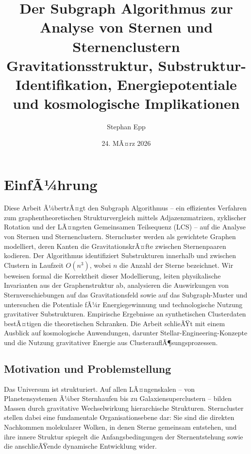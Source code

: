 ﻿\documentclass[a4paper,12pt]{report}
\title{\textbf{Der Subgraph Algorithmus zur Analyse von Sternen und Sternenclustern}\\
\large Gravitationsstruktur, Substruktur-Identifikation, Energiepotentiale\\
und kosmologische Implikationen}
\author{Stephan Epp}
\date{24. MÃ¤rz 2026}
\theoremstyle{definition}
\begin{document}
\maketitle

\tableofcontents
\newpage

\chapter{EinfÃ¼hrung}
Diese Arbeit Ã¼bertrÃ¤gt den Subgraph Algorithmus -- ein effizientes Verfahren zum graphentheoretischen Strukturvergleich mittels Adjazenzmatrizen, zyklischer Rotation und der LÃ¤ngsten Gemeinsamen Teilsequenz (LCS) -- auf die Analyse von Sternen und Sternenclustern. Sterncluster werden als gewichtete Graphen modelliert, deren Kanten die GravitationskrÃ¤fte zwischen Sternenpaaren kodieren. Der Algorithmus identifiziert Substrukturen innerhalb und zwischen Clustern in Laufzeit $O(n^3)$, wobei $n$ die Anzahl der Sterne bezeichnet. Wir beweisen formal die Korrektheit dieser Modellierung, leiten physikalische Invarianten aus der Graphenstruktur ab, analysieren die Auswirkungen von Sternverschiebungen auf das Gravitationsfeld sowie auf das Subgraph-Muster und untersuchen die Potentiale fÃ¼r Energiegewinnung und technologische Nutzung gravitativer Substrukturen. Empirische Ergebnisse an synthetischen Clusterdaten bestÃ¤tigen die theoretischen Schranken. Die Arbeit schlieÃŸt mit einem Ausblick auf kosmologische Anwendungen, darunter Stellar-Engineering-Konzepte und die Nutzung gravitativer Energie aus ClusterauflÃ¶sungsprozessen.

\section{Motivation und Problemstellung}

Das Universum ist strukturiert. Auf allen LÃ¤ngenskalen -- von Planetensystemen Ã¼ber Sternhaufen bis zu Galaxiensuperclustern -- bilden Massen durch gravitative Wechselwirkung hierarchische Strukturen. Sterncluster stellen dabei eine fundamentale Organisationsebene dar: Sie sind die direkten Nachkommen molekularer Wolken, in denen Sterne gemeinsam entstehen, und ihre innere Struktur spiegelt die Anfangsbedingungen der Sternentstehung sowie die anschlieÃŸende dynamische Entwicklung wider.
\end{document}
